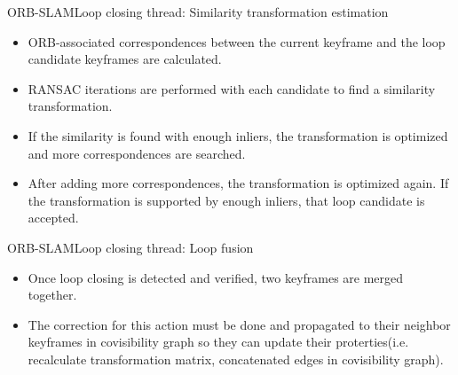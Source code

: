 \documentclass{beamer}
\begin{document}
\begin{frame}{ORB-SLAM}{Loop closing thread: Similarity transformation estimation}
  \begin{itemize}
      \item{
      ORB-associated correspondences between the current keyframe and the loop candidate keyframes are calculated.
      }
      \item{
      RANSAC iterations are performed with each candidate to find a similarity transformation. 
      }
      \item{
      If the similarity is found with enough inliers, the transformation is optimized and more correspondences are searched.
      }
      \item{
      After adding more correspondences, the transformation is optimized again. If the transformation is supported by enough inliers, that loop candidate is accepted.
      }
  \end{itemize}
\end{frame}

\begin{frame}{ORB-SLAM}{Loop closing thread: Loop fusion}
  \begin{itemize}
      \item{
      Once loop closing is detected and verified, two keyframes are merged together.
      }
      \item{
      The correction for this action must be done and propagated to their neighbor keyframes in covisibility graph so they can update their proterties(i.e. recalculate transformation matrix, concatenated edges in covisibility graph). 

      }
  \end{itemize}
\end{frame}
\end{document}
